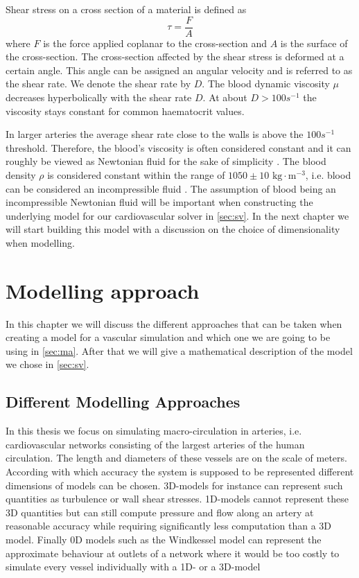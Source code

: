 \documentclass[a4paper, oneside]{discothesis}
\begin{document}
Shear stress on a cross section of a material is defined as 
\begin{equation}
	\tau = \frac{F}{A}
\end{equation}
where $F$ is the force applied coplanar to the cross-section and $A$ is the surface of the cross-section.
The cross-section affected by the shear stress is deformed at a certain angle. 
This angle can be assigned an angular velocity and is referred to as the shear rate.
We denote the shear rate by $D$. \cite{köppl2023dimension}
The blood dynamic viscosity $\mu$ decreases hyperbolically with the shear rate $D$.
At about $D > 100s^{-1}$ the viscosity stays constant for common haematocrit values.

In larger arteries the average shear rate close to the walls is above the $100s^{-1}$ threshold. \cite{MCDbook}
Therefore, the blood's viscosity is often considered constant and it can roughly be viewed as Newtonian fluid for the sake of simplicity \cite{fung1996biomechanics,guyton2006textbook,MCDbook,pedley_1980,zamir2000physics,zamir2006physics}. 
The blood density $\rho$ is considered constant within the range of $1050 \pm 10 \text{ kg}\cdot\text{m}^{-3}$, i.e. blood can be considered an incompressible fluid \cite{PMID:2658951,kenner1977continuous,helmig1997multiphase}.
The assumption of blood being an incompressible Newtonian fluid will be important when constructing the underlying model for our cardiovascular solver in \autoref{sec:sv}. In the next chapter we will start building this model with a discussion on the choice of dimensionality when modelling.

\chapter{Modelling approach} \label{chap:1dm}
In this chapter we will discuss the different approaches that can be taken when creating a model for a vascular simulation and which one we are going to be using in \autoref{sec:ma}.
After that we will give a mathematical description of the model we chose in \autoref{sec:sv}.

\section{Different Modelling Approaches} \label{sec:ma}
In this thesis we focus on simulating macro-circulation in arteries, i.e. cardiovascular networks consisting of the largest arteries of the human circulation.
The length and diameters of these vessels are on the scale of meters.
According with which accuracy the system is supposed to be represented different dimensions of models can be chosen.
3D-models for instance can represent such quantities as turbulence or wall shear stresses.
1D-models cannot represent these 3D quantities but can still compute pressure and flow along an artery at reasonable accuracy while requiring significantly less computation than a 3D model.
Finally 0D models such as the Windkessel model can represent the approximate behaviour at outlets of a network where it would be too costly to simulate every vessel individually with a 1D- or a 3D-model
\end{document}
